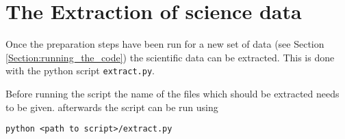 \documentclass[10pt,a4paper]{article}
\begin{document}


\newpage
\section{The Extraction of science data}
\label{section:extraction}



Once the preparation steps have been run for a new set of data (see Section \ref{Section:running_the_code}) the scientific data can be extracted. This is done with the python script \verb|extract.py|.

Before running the script the name of the files which should be extracted needs to be given. afterwards the script can be run using
\begin{lstlisting}[style=base]
python <path to script>/extract.py
\end{lstlisting}
\end{document}
